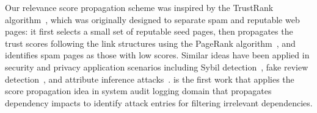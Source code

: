 









Our relevance score propagation scheme was inspired by the TrustRank algorithm~\cite{Gyongyi:2004:vldb}, which was originally designed to separate spam and reputable web pages: it first selects a small set of reputable seed pages, then propagates the trust scores following the link structures using the PageRank algorithm~\cite{Page:techreport:1998}, and identifies spam pages as those with low scores. Similar ideas have been applied in security and privacy application scenarios
including Sybil detection~\cite{cao2012sybilrank,Gong:2014:tifs,gao2018sybilfuse}, fake review detection~\cite{Rayana:2015:COS:2783258.2783370}, and attribute inference attacks~\cite{jia2017attriinfer}.
%
\tool is the first work that applies the score propagation idea in system audit logging domain that propagates dependency impacts to identify attack entries for filtering irrelevant dependencies.



